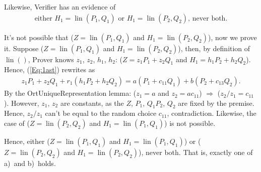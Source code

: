 \documentclass{mathcryptology} %
\DeclareMathOperator{\lin}{lin}
\theoremstyle{title}
\theoremstyle{titleof}
\renewenvironment{proof}{\noindent{\bfseries Proof:} }{}
\begin{document}
\begin{proof}
        Likewise, Verifier has an evidence of
        \begin{gather*}
            \text{either $H_{1}=\lin\left(P_{1}, Q_{1}\right)$ or $H_{1}=\lin\left(P_{2}, Q_{2}\right)$, never both}.
        \end{gather*}

        It's not possible that ($Z=\lin\left(P_{1}, Q_{1}\right)$ and $H_{1}=\lin\left(P_{2},Q_{2}\right)$), now we prove it. Suppose ($Z=\lin\left(P_{1}, Q_{1}\right)$ and $H_{1} = \lin\left(P_{2}, Q_{2}\right)$), then, by definition of $\lin()$, Prover knows $z_{1}$, $z_{2}$, $h_{1}$, $h_{2}$: ($Z=z_{1} P_{1} + z_{2} Q_{1}$ and $H_{1} =h_{1}P_{2}+h_{2} Q_{2}$). Hence, (\ref{Eq:1ast}) rewrites as
        \begin{gather*}
        	z_{1} P_{1}+ z_{2} Q_{1}+r_{1}\left(h_{1}P_{2}+h_{2}Q_{2}\right) = a\left(P_{1}+c_{11}Q_{1}\right)+b\left(P_{2}+c_{13}Q_{2}\right).
        \end{gather*}
        By the OrtUniqueRepresentation lemma: ($z_{1}=a$ and $z_{2} =ac_{11}$) $\Rightarrow$ ($z_{2}/z_{1}=c_{11}$).
        However, $z_{1}$, $z_{2}$ are constants, as the $Z$, $P_{1}$, $Q_{1}P_{2}$, $Q_{2}$ are fixed by the premise. Hence, $z_{2}/z_{1}$ can't be equal to the random choice $c_{11}$, contradiction.
        Likewise, the case of ($Z=\lin\left(P_{2}, Q_{2}\right)$ and $H_{1}=\lin\left(P_{1},Q_{1}\right)$) is not possible.

        Hence, either
        ($Z=\lin\left(P_{1},Q_{1}\right)$ and $H_{1} = \lin\left(P_{1},Q_{1}\right)$) or
        ($Z=\lin\left(P_{2},Q_{2}\right)$ and $H_{1} = \lin\left(P_{2},Q_{2}\right)$), never both. That is, exactly one of a)~and b)~holds.
    \end{proof}
\end{document}
